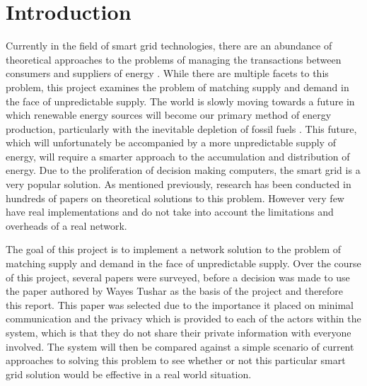 \documentclass[a4paper, notitlepage]{report}
\author{Brian McNestry}
\date{\today}
\title{}
\begin{document}
\inserttitlepage


\declaration

\permissiontolend

\insertabstract

\acknowledgements

\tableofcontents

\newpage


\part{Introduction}
\label{sec:org171ad23}
Currently in the field of smart grid technologies, there are an abundance of
theoretical approaches to the problems of managing the transactions between
consumers and suppliers of energy \cite{ambrosio2016transactive}. While there are
multiple facets to this problem, this project examines the problem of matching
supply and demand in the face of unpredictable supply. The world is slowly
moving towards a future in which renewable energy sources will become our
primary method of energy production, particularly with the inevitable depletion
of fossil fuels \cite{boyle1997renewable}. This future, which will unfortunately
be accompanied by a more unpredictable supply of energy, will require a smarter
approach to the accumulation and distribution of energy. Due to the
proliferation of decision making computers, the smart grid is a very popular
solution. As mentioned previously, research has been conducted in hundreds of
papers on theoretical solutions to this problem. However very few have real
implementations and do not take into account the limitations and overheads of a
real network.

The goal of this project is to implement a network solution to the problem of
matching supply and demand in the face of unpredictable supply. Over the course
of this project, several papers were surveyed, before a decision was made to use
the paper authored by Wayes Tushar \cite{tushar2014prioritizing} as the basis of
the project and therefore this report. This paper was selected due to the
importance it placed on minimal communication and the privacy which is provided
to each of the actors within the system, which is that they do not share their
private information with everyone involved. The system will then be compared
against a simple scenario of current approaches to solving this problem to see
whether or not this particular smart grid solution would be effective in a real
world situation.
\end{document}

